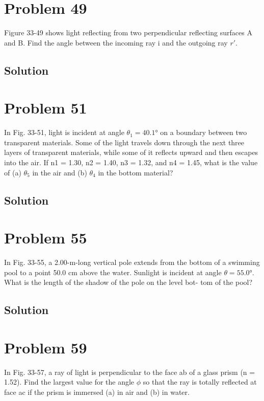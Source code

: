\documentclass[12pt]{article}
\begin{document}
    \pagebreak
    \section{Problem 49}
        Figure 33-49 shows light
reflecting from two perpendicular
reflecting surfaces A and B. Find
the angle between the incoming ray
i and the outgoing ray $r'$.

        \subsection{Solution}

    \pagebreak
    \section{Problem 51}
        In Fig. 33-51, light is
incident at angle $\theta_1 = 40.1\unit{\degree}$ on a
boundary between two transparent
materials. Some of the light travels
down through the next three layers
of transparent materials, while some
of it reflects upward and then escapes
into the air. If n1 = 1.30, n2 = 1.40,
n3 = 1.32, and n4 = 1.45, what is the
value of (a) $\theta_5$ in the air and (b) $\theta_4$ in
the bottom material?

        \subsection{Solution}

    \pagebreak
    \section{Problem 55}
        In Fig. 33-55, a
2.00-m-long vertical pole extends
from the bottom of a swimming pool
to a point 50.0 cm above the water.
Sunlight is incident at angle
$\theta = 55.0\unit{\degree}$. What is the length of the
shadow of the pole on the level bot-
tom of the pool?

        \subsection{Solution}

    \pagebreak
    \section{Problem 59}
        In Fig. 33-57, a
ray of light is perpendicular to the
face ab of a glass prism (n = 1.52).
Find the largest value for the angle
$\phi$ so that the ray is totally reflected
at face ac if the prism is immersed
(a) in air and (b) in water.
\end{document}
